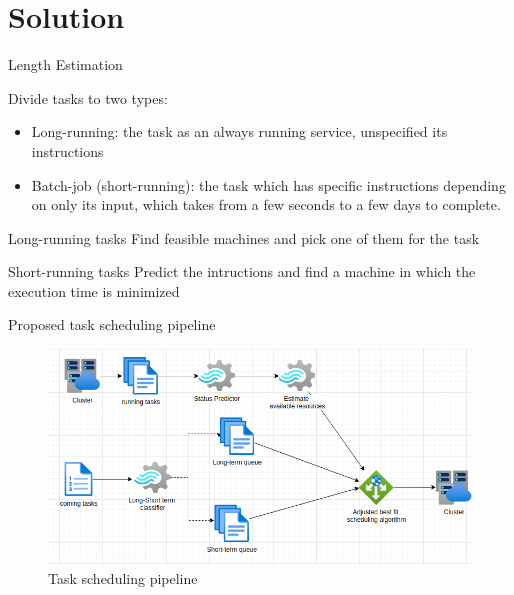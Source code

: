 \documentclass[10pt,xcolor={dvipsnames}, aspectratio=169]{beamer}
\begin{document}
\section{Solution}

\begin{frame}
{Length Estimation}
	\begin{block}
	{Divide tasks to two types:} 
		\begin{itemize}
			\item Long-running: the task as an always running service, unspecified its instructions
			\item Batch-job (short-running): the task which has specific instructions depending on only its input, which takes 
			from a few seconds to a few days to complete.
		\end{itemize}
	\end{block}
	
	\begin{block}
	{Long-running tasks}
	Find feasible machines and pick one of them for the task 
	\end{block}
	\begin{block}
	{Short-running tasks}
	Predict the intructions and find a machine in which the execution time is minimized
	\end{block}
\end{frame}

\begin{frame}
{Proposed task scheduling pipeline}
	\begin{figure}
		\centering
		\includegraphics[scale=0.5]{images/scheduling_pipeline.png}
		\caption{Task scheduling pipeline}
	\end{figure}
\end{frame}
\end{document}
